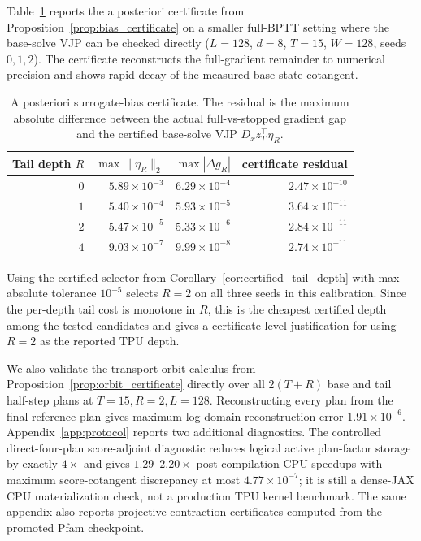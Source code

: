 Table~\ref{tab:bias_certificate} reports the a posteriori certificate from Proposition~\ref{prop:bias_certificate} on a smaller full-BPTT setting where the base-solve VJP can be checked directly ($L=128$, $d=8$, $T=15$, $W=128$, seeds $0,1,2$). The certificate reconstructs the full-gradient remainder to numerical precision and shows rapid decay of the measured base-state cotangent.

\begin{table}[h]
    \centering
    \begin{tabular}{@{}rrrr@{}}
        \toprule
        Tail depth $R$ & $\max\|\eta_R\|_2$ & $\max|\Delta g_R|$ & certificate residual \\
        \midrule
        $0$ & $5.89\times 10^{-3}$ & $6.29\times 10^{-4}$ & $2.47\times 10^{-10}$ \\
        $1$ & $5.40\times 10^{-4}$ & $5.93\times 10^{-5}$ & $3.64\times 10^{-11}$ \\
        $2$ & $5.47\times 10^{-5}$ & $5.33\times 10^{-6}$ & $2.84\times 10^{-11}$ \\
        $4$ & $9.03\times 10^{-7}$ & $9.99\times 10^{-8}$ & $2.74\times 10^{-11}$ \\
        \bottomrule
    \end{tabular}
    \caption{A posteriori surrogate-bias certificate. The residual is the maximum absolute difference between the actual full-vs-stopped gradient gap and the certified base-solve VJP $D_x z_T^\top\eta_R$.}
    \label{tab:bias_certificate}
\end{table}

Using the certified selector from Corollary~\ref{cor:certified_tail_depth} with max-absolute tolerance $10^{-5}$ selects $R=2$ on all three seeds in this calibration. Since the per-depth tail cost is monotone in $R$, this is the cheapest certified depth among the tested candidates and gives a certificate-level justification for using $R=2$ as the reported TPU depth.

We also validate the transport-orbit calculus from Proposition~\ref{prop:orbit_certificate} directly over all $2(T+R)$ base and tail half-step plans at $T=15,R=2,L=128$. Reconstructing every plan from the final reference plan gives maximum log-domain reconstruction error $1.91\times 10^{-6}$. Appendix~\ref{app:protocol} reports two additional diagnostics. The controlled direct-four-plan score-adjoint diagnostic reduces logical active plan-factor storage by exactly $4\times$ and gives $1.29$--$2.20\times$ post-compilation CPU speedups with maximum score-cotangent discrepancy at most $4.77\times10^{-7}$; it is still a dense-JAX CPU materialization check, not a production TPU kernel benchmark. The same appendix also reports projective contraction certificates computed from the promoted Pfam checkpoint.

